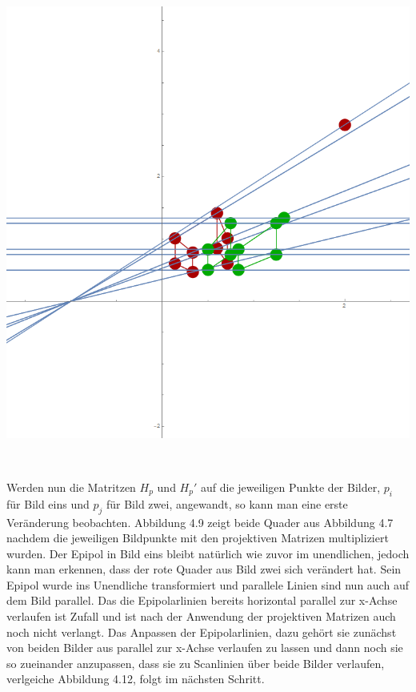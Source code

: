 \begin{minipage}{\linewidth}
	\centering
	\includegraphics[width=.8\linewidth]{images/Rectification_two_same_Solutions.png}
\end{minipage}\\

\pagebreak

Werden nun die Matritzen $H_p$ und $H_p'$ auf die jeweiligen Punkte der Bilder, $p_i$ für Bild eins und $p_j$ für Bild zwei, angewandt, so kann man eine erste Veränderung beobachten. Abbildung 4.9 zeigt beide Quader aus Abbildung 4.7 nachdem die jeweiligen Bildpunkte mit den projektiven Matrizen multipliziert wurden. Der Epipol in Bild eins bleibt natürlich wie zuvor im unendlichen, jedoch kann man erkennen, dass der rote Quader aus Bild zwei sich verändert hat. Sein Epipol wurde ins Unendliche transformiert und parallele Linien sind nun auch auf dem Bild parallel. Das die Epipolarlinien bereits horizontal parallel zur x-Achse verlaufen ist Zufall und ist nach der Anwendung der projektiven Matrizen auch noch nicht verlangt. Das Anpassen der Epipolarlinien, dazu gehört sie zunächst von beiden Bilder aus parallel zur x-Achse verlaufen zu lassen und dann noch sie so zueinander anzupassen, dass sie zu Scanlinien über beide Bilder verlaufen, verlgeiche Abbildung 4.12, folgt im nächsten Schritt. \\


